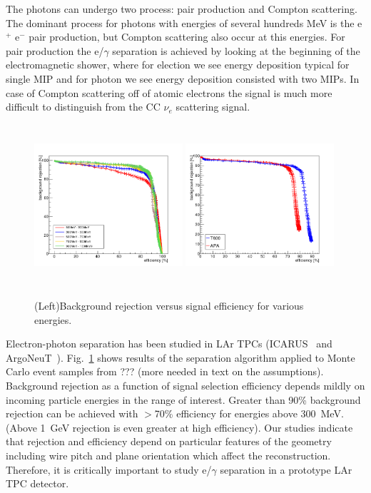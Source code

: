 The photons can undergo two process: pair production and Compton scattering. 
The dominant process for photons with energies of several hundreds MeV  is 
the e$^+$ e$^-$ pair production, but Compton scattering also occur at this 
energies. For pair production the e/$\gamma$ separation is achieved by looking 
at the beginning of the electromagnetic shower, where for election we see energy 
deposition typical for single MIP and for photon we see energy deposition consisted 
with two MIPs. In case of Compton scattering off of atomic electrons the 
signal is much more difficult to distinguish from the CC $\nu_e$ scattering signal.


\begin{figure}[h!]
  \centering
\includegraphics[width=0.49\textwidth,height=6.0cm]{figures/eff-bgdrej-diffen}
\includegraphics[width=0.49\textwidth,height=6.0cm]{figures/APAT600_all_norm}
\label{fig:egam}
  \caption{(Left)Background rejection versus signal efficiency for various energies.
{\color{red}
}
}
\end{figure}
Electron-photon separation has been studied in LAr TPCs
(ICARUS~\cite{icarus_eg} and ArgoNeuT~\cite{argoneut_eg}).
Fig.~\ref{fig:egam} shows results of the separation algorithm applied to Monte Carlo event
samples from ??? (more needed in text on the assumptions). 
Background rejection as a function of signal
selection efficiency depends mildly
on incoming particle energies in the range of interest. 
Greater than 90\% background rejection can be 
achieved with $>$70\% efficiency for energies above 300~MeV. (Above 1~GeV 
rejection is even greater at high efficiency).
Our studies indicate that rejection and efficiency depend 
on particular features of the geometry including wire pitch and plane 
orientation which affect the reconstruction. 
Therefore, it is critically important 
to study e/$\gamma$ separation in a prototype LAr TPC detector.

